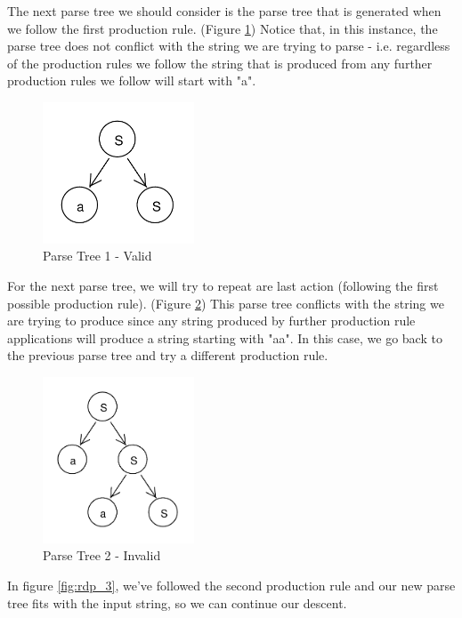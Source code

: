 \documentclass[11pt]{article}
\begin{document}
The next parse tree we should consider is the parse tree that is generated when we follow the first 
production rule. (Figure \ref{fig:rdp_1}) Notice that, in this instance, the parse tree does not conflict with
the string we are trying to parse - i.e. regardless of the production rules we follow the string that is
produced from any further production rules we follow will start with "a".

\begin{figure}[h!]
    \centering
    \includegraphics[width=0.4\textwidth,natwidth=30,natheight=30]{umlet/rdp_1.pdf}
    \caption{Parse Tree 1 - Valid}
    \label{fig:rdp_1}
\end{figure}

For the next parse tree, we will try to repeat are last action (following the first possible production rule).
(Figure \ref{fig:rdp_2}) This parse tree conflicts with the string we are trying to produce since any
string produced by further production rule applications will produce a string starting with "aa".
In this case, we go back to the previous parse tree and try a different production rule.

\begin{figure}[h!]
    \centering
    \includegraphics[width=0.4\textwidth,natwidth=30,natheight=30]{umlet/rdp_2.pdf}
    \caption{Parse Tree 2 - Invalid}
    \label{fig:rdp_2}
\end{figure}

In figure \ref{fig:rdp_3}, we've followed the second production rule
and our new parse tree fits with the input string, so we can continue our descent.
\end{document}
